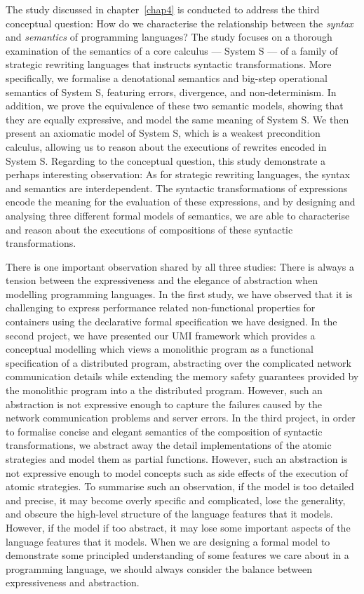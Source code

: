 The study discussed in chapter~\ref{chap4} is conducted to address the third conceptual question: How do we characterise the relationship between the \emph{syntax} and \emph{semantics} of programming languages? The study focuses on a thorough examination of the semantics of a core calculus --- System S --- of a family of strategic rewriting languages that instructs syntactic transformations. More specifically, we formalise a denotational semantics and big-step operational semantics of System S, featuring errors, divergence, and non-determinism. In addition, we prove the equivalence of these two semantic models, showing that they are equally expressive, and model the same meaning of System S. We then present an axiomatic model of System S, which is a weakest precondition calculus, allowing us to reason about the executions of rewrites encoded in System S. Regarding to the conceptual question, this study demonstrate a perhaps interesting observation: As for strategic rewriting languages, the syntax and semantics are interdependent. The syntactic transformations of expressions encode the meaning for the evaluation of these expressions, and by designing and analysing three different formal models of semantics, we are able to characterise and reason about the executions of compositions of these syntactic transformations.

There is one important observation shared by all three studies: There is always a tension between the expressiveness and the elegance of abstraction when modelling programming languages. In the first study, we have observed that it is challenging to express performance related non-functional properties for containers using the declarative formal specification we have designed. In the second project, we have presented our UMI framework which provides a conceptual modelling which views a monolithic program as a functional specification of a distributed program, abstracting over the complicated network communication details while extending the memory safety guarantees provided by the monolithic program into a the distributed program. However, such an abstraction is not expressive enough to capture the failures caused by the network communication problems and server errors. In the third project, in order to formalise concise and elegant semantics of the composition of syntactic transformations, we abstract away the detail implementations of the atomic strategies and model them as partial functions. However, such an abstraction is not expressive enough to model concepts such as side effects of the execution of atomic strategies. To summarise such an observation, if the model is too detailed and precise, it may become overly specific and complicated, lose the generality, and obscure the high-level structure of the language features that it models. However, if the model if too abstract, it may lose some important aspects of the language features that it models. When we are designing a formal model to demonstrate some principled understanding of some features we care about in a programming language, we should always consider the balance between expressiveness and abstraction. 

